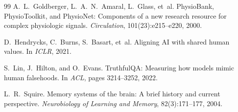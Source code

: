 \documentclass[12pt]{book}
\begin{document}
\begin{thebibliography}{99}
A.~L.~Goldberger, L.~A.~N.~Amaral, L.~Glass, et~al.
\newblock PhysioBank, PhysioToolkit, and PhysioNet: Components of a new research resource for complex physiologic signals.
\newblock \textit{Circulation}, 101(23):e215--e220, 2000.

D.~Hendrycks, C.~Burns, S.~Basart, et~al.
\newblock Aligning AI with shared human values.
\newblock In \textit{ICLR}, 2021.

S.~Lin, J.~Hilton, and O.~Evans.
\newblock TruthfulQA: Measuring how models mimic human falsehoods.
\newblock In \textit{ACL}, pages 3214--3252, 2022.

L.~R.~Squire.
\newblock Memory systems of the brain: A brief history and current perspective.
\newblock \textit{Neurobiology of Learning and Memory}, 82(3):171--177, 2004.

\end{thebibliography}
\end{document}
